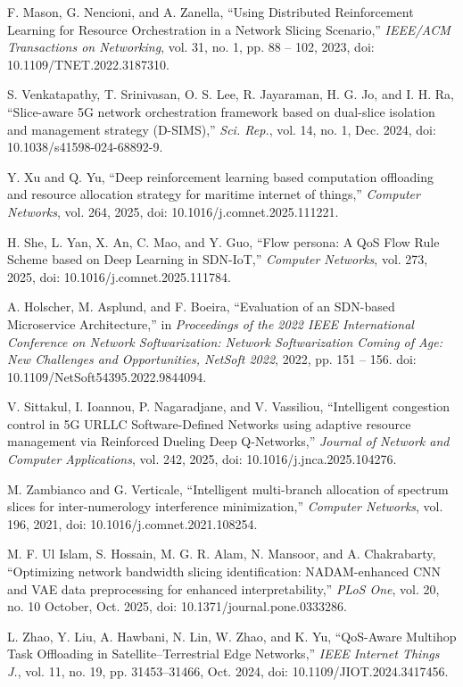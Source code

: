  F. Mason, G. Nencioni, and A. Zanella, ``Using Distributed Reinforcement Learning for Resource Orchestration in a Network Slicing Scenario,'' \emph{IEEE/ACM Transactions on Networking}, vol. 31, no. 1, pp. 88 -- 102, 2023, doi: 10.1109/TNET.2022.3187310.

 S. Venkatapathy, T. Srinivasan, O. S. Lee, R. Jayaraman, H. G. Jo, and I. H. Ra, ``Slice-aware 5G network orchestration framework based on dual-slice isolation and management strategy (D-SIMS),'' \emph{Sci. Rep.}, vol. 14, no. 1, Dec. 2024, doi: 10.1038/s41598-024-68892-9.

 Y. Xu and Q. Yu, ``Deep reinforcement learning based computation offloading and resource allocation strategy for maritime internet of things,'' \emph{Computer Networks}, vol. 264, 2025, doi: 10.1016/j.comnet.2025.111221.

 H. She, L. Yan, X. An, C. Mao, and Y. Guo, ``Flow persona: A QoS Flow Rule Scheme based on Deep Learning in SDN-IoT,'' \emph{Computer Networks}, vol. 273, 2025, doi: 10.1016/j.comnet.2025.111784.

 A. Holscher, M. Asplund, and F. Boeira, ``Evaluation of an SDN-based Microservice Architecture,'' in \emph{Proceedings of the 2022 IEEE International Conference on Network Softwarization: Network Softwarization Coming of Age: New Challenges and Opportunities, NetSoft 2022}, 2022, pp. 151 -- 156. doi: 10.1109/NetSoft54395.2022.9844094.

 V. Sittakul, I. Ioannou, P. Nagaradjane, and V. Vassiliou, ``Intelligent congestion control in 5G URLLC Software-Defined Networks using adaptive resource management via Reinforced Dueling Deep Q-Networks,'' \emph{Journal of Network and Computer Applications}, vol. 242, 2025, doi: 10.1016/j.jnca.2025.104276.

 M. Zambianco and G. Verticale, ``Intelligent multi-branch allocation of spectrum slices for inter-numerology interference minimization,'' \emph{Computer Networks}, vol. 196, 2021, doi: 10.1016/j.comnet.2021.108254.

 M. F. Ul Islam, S. Hossain, M. G. R. Alam, N. Mansoor, and A. Chakrabarty, ``Optimizing network bandwidth slicing identification: NADAM-enhanced CNN and VAE data preprocessing for enhanced interpretability,'' \emph{PLoS One}, vol. 20, no. 10 October, Oct. 2025, doi: 10.1371/journal.pone.0333286.

 L. Zhao, Y. Liu, A. Hawbani, N. Lin, W. Zhao, and K. Yu, ``QoS-Aware Multihop Task Offloading in Satellite--Terrestrial Edge Networks,'' \emph{IEEE Internet Things J.}, vol. 11, no. 19, pp. 31453--31466, Oct. 2024, doi: 10.1109/JIOT.2024.3417456.

